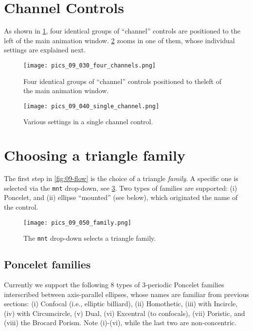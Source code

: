 \section{Channel Controls}

As shown in \cref{fig:09-four-channels}, four identical groups of ``channel'' controls are positioned to the left of the main animation window. \cref{fig:09-single-channel} zooms in one of them, whose individual settings are explained next.

\begin{figure}
    \centering
    \texttt{[image: pics\_09\_030\_four\_channels.png]}
    \caption{Four identical groups of ``channel'' controls positioned to theleft of the main animation window.}
    \label{fig:09-four-channels}
\end{figure}

\begin{figure}
    \centering
    \texttt{[image: pics\_09\_040\_single\_channel.png]}
    \caption{Various settings in a single channel control.}
    \label{fig:09-single-channel}
\end{figure}

\section{Choosing a triangle family}

The first step in \cref{fig:09-flow} is the choice of a triangle {\em family}. A specific one is selected 
via the \texttt{mnt} drop-down, see \cref{fig:09-menu-family}. Two types of families are supported: (i) Poncelet, and (ii) ellipse ``mounted'' (see below), which originated the name of the control.

\begin{figure}
    \centering
    \texttt{[image: pics\_09\_050\_family.png]}
    \caption{The \texttt{mnt} drop-down selects a triangle family.}
    \label{fig:09-menu-family}
\end{figure}

\subsection{Poncelet families} Currently we support the following 8 types of 3-periodic Poncelet families interscribed between axis-parallel ellipses, whose names are familiar from previous sections: (i) Confocal (i.e., elliptic billiard), (ii) Homothetic, (iii) with Incircle, (iv) with Circumcircle, (v) Dual, (vi) Excentral (to confocals),  (vii) Poristic, and (viii) the Brocard Porism. Note (i)-(vi),  while the last two are non-concentric.

